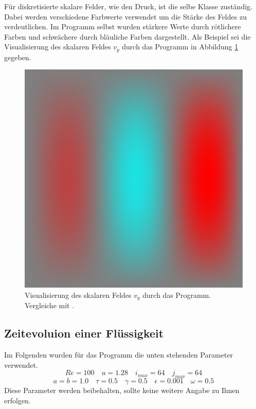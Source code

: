		Für diskretisierte skalare Felder, wie den Druck, ist die selbe Klasse zuständig.
		Dabei werden verschiedene Farbwerte verwendet um die Stärke des Feldes zu verdeutlichen.
		Im Programm selbst wurden stärkere Werte durch rötlichere Farben und schwächere durch bläuliche Farben dargestellt.
		Als Beispiel sei die Visualisierung des skalaren Feldes $v_y$ durch das Programm in Abbildung \ref{fig:example view scalar} gegeben.

		\begin{figure}[!htb]
			\center
			\includegraphics[scale = 0.35]{screenshots/example-02.png}
			\caption{Visualisierung des skalaren Feldes $v_y$ durch das Programm. \\ Vergleiche mit \cite{nsfd}.}
			\label{fig:example view scalar}
		\end{figure}


	\subsection{Zeitevoluion einer Flüssigkeit} %
	\label{sub:zeitevoluion_einer_fl_ssigkeit}
	
		Im Folgenden wurden für das Programm die unten stehenden Parameter verwendet.
		\[ Re = 100 \quad u = 1.28 \quad i_{max} = 64 \quad j_{max} = 64 \]
		\[ a=b=1.0 \quad \tau = 0.5 \quad \gamma = 0.5 \quad \epsilon = 0.001 \quad \omega = 0.5 \]
		Diese Parameter werden beibehalten, sollte keine weitere Angabe zu Ihnen erfolgen.

